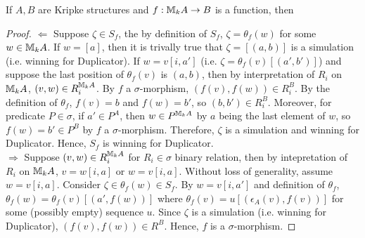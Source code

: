 \begin{thm}
If $A,B$ are Kripke structures and $f:{\mathbb{M}_{k}A} \rightarrow B$ is a function, then 
\begin{proof}
$\Leftarrow$ Suppose $\zeta \in S_{f}$, the by definition of $S_{f}$, $\zeta = \theta_{f}(w)$ for some $w \in {\mathbb{M}_{k}A}$. If $w = [a]$, then it is trivally true that $\zeta = [(a,b)]$ is a simulation (i.e. winning for Duplicator). If $w = v[i,a']$ (i.e. $\zeta = \theta_{f}(v)[(a',b')]$) and suppose the last position of $\theta_{f}(v)$ is $(a,b)$, then by interpretation of $R_{i}$ on ${\mathbb{M}_{k}A}$, $(v,w) \in R_{i}^{{\mathbb{M}_{k}A}}$. By $f$ a $\sigma$-morphism, $(f(v),f(w)) \in R_{i}^{B}$. By the definition of $\theta_{f}$, $f(v) = b$ and $f(w) = b'$, so $(b,b') \in R_{i}^{B}$. Moreover, for predicate $P \in \sigma$, if $a' \in P^{A}$, then $w \in P^{{\mathbb{M}_{k}A}}$ by $a$ being the last element of $w$, so $f(w) = b' \in P^{B}$ by $f$ a $\sigma$-morphism. Therefore, $\zeta$ is a simulation and winning for Duplicator. Hence, $S_{f}$ is winning for Duplicator.\\
$\Rightarrow$ Suppose $(v,w) \in R_{i}^{{\mathbb{M}_{k}A}}$ for $R_{i} \in \sigma$ binary relation, then by intepretation of $R_{i}$ on ${\mathbb{M}_{k}A}$, $v = w[i,a]$ or $w = v[i,a]$. Without loss of generality, assume $w = v[i,a]$. Consider $\zeta \in \theta_{f}(w) \in S_{f}$. By $w = v[i,a']$ and definition of $\theta_{f}$, $\theta_{f}(w) = \theta_{f}(v)[(a',f(w))]$ where $\theta_{f}(v) = u[(\epsilon_{A}(v),f(v))]$ for some (possibly empty) sequence $u$. Since $\zeta$ is a simulation (i.e. winning for Duplicator), $(f(v),f(w)) \in R^{B}$. Hence, $f$ is a $\sigma$-morphism.
\end{proof}
\label{thm:toPositionalFormM}
\end{thm}
